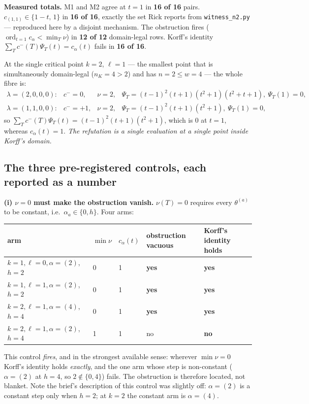 \documentclass[11pt]{article}
\theoremstyle{definition}
\DeclareMathOperator{\ord}{ord}
\begin{document}
\noindent\textbf{Measured totals.}
M1 and M2 agree at $t=1$ in \textbf{16 of 16} pairs.
$c_{(1,1)}\in\{1-t,\,1\}$ in \textbf{16 of 16}, exactly the set Rick reports from
\texttt{witness\_n2.py} --- reproduced here by a disjoint mechanism.
The obstruction fires ($\ord_{t=1}c_\alpha<\min_T\nu$) in \textbf{12 of 12}
domain-legal rows.  Korff's identity
$\sum_T c^-(T)\Psi_T(t)=c_\alpha(t)$ fails in \textbf{16 of 16}.

At the single critical point $k=2$, $\ell=1$ --- the smallest point that is
simultaneously domain-legal ($n_K=4>2$) and has $n=2\le w=4$ --- the whole fibre is:
\[
\begin{array}{llll}
\lambda=(2,0,0,0): & c^-=0, & \nu=2, &
  \Psi_T=(t-1)^2(t+1)(t^2+1)(t^2+t+1),\ \Psi_T(1)=0,\\
\lambda=(1,1,0,0): & c^-=+1, & \nu=2, &
  \Psi_T=(t-1)^2(t+1)(t^2+1),\ \Psi_T(1)=0,
\end{array}
\]
so $\sum_T c^-(T)\Psi_T(t)=(t-1)^2(t+1)(t^2+1)$, which is $0$ at $t=1$, whereas
$c_\alpha(t)=1$.  \emph{The refutation is a single evaluation at a single point inside
Korff's domain.}

\subsection{The three pre-registered controls, each reported as a number}

\textbf{(i) $\nu=0$ must make the obstruction vanish.}  $\nu(T)=0$ requires every
$\theta^{(a)}$ to be constant, i.e.\ $\alpha_a\in\{0,h\}$.  Four arms:
\begin{center}\small
\begin{tabular}{@{}lllll@{}}
\toprule
arm & $\min\nu$ & $c_\alpha(t)$ & obstruction vacuous & Korff's identity holds \\
\midrule
$k=1,\ell=0,\alpha=(2)$, $h=2$ & 0 & 1 & \textbf{yes} & \textbf{yes} \\
$k=1,\ell=1,\alpha=(2)$, $h=2$ & 0 & 1 & \textbf{yes} & \textbf{yes} \\
$k=2,\ell=1,\alpha=(4)$, $h=4$ & 0 & 1 & \textbf{yes} & \textbf{yes} \\
$k=2,\ell=1,\alpha=(2)$, $h=4$ & 1 & 1 & no & \textbf{no} \\
\bottomrule
\end{tabular}
\end{center}
This control \emph{fires}, and in the strongest available sense: wherever $\min\nu=0$
Korff's identity holds \emph{exactly}, and the one arm whose step is non-constant
($\alpha=(2)$ at $h=4$, so $2\notin\{0,4\}$) fails.  The obstruction is therefore
located, not blanket.  Note the brief's description of this control was slightly off:
$\alpha=(2)$ is a constant step only when $h=2$; at $k=2$ the constant arm is
$\alpha=(4)$.
\end{document}
